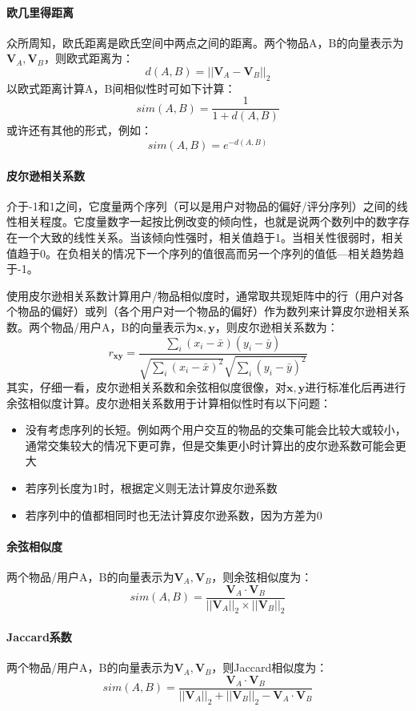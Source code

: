 \paragraph{欧几里得距离}
众所周知，欧氏距离是欧氏空间中两点之间的距离。两个物品A，B的向量表示为$\boldsymbol{V}_A, \boldsymbol{V}_B$，则欧式距离为：
$$
d(A, B) = ||\boldsymbol{V}_A - \boldsymbol{V}_B||_2
$$
以欧式距离计算A，B间相似性时可如下计算：
$$
sim(A, B) = \frac{1}{1 + d(A, B)}
$$
或许还有其他的形式，例如：
$$
sim(A, B) = e^{-d(A, B)}
$$

\paragraph{皮尔逊相关系数}
介于-1和1之间，它度量两个序列（可以是用户对物品的偏好/评分序列）之间的线性相关程度。它度量数字一起按比例改变的倾向性，也就是说两个数列中的数字存在一个大致的线性关系。当该倾向性强时，相关值趋于1。当相关性很弱时，相关值趋于0。在负相关的情况下一个序列的值很高而另一个序列的值低---相关趋势趋于-1。

使用皮尔逊相关系数计算用户/物品相似度时，通常取共现矩阵中的行（用户对各个物品的偏好）或列（各个用户对一个物品的偏好）作为数列来计算皮尔逊相关系数。两个物品/用户A，B的向量表示为$\boldsymbol{x}, \boldsymbol{y}$，则皮尔逊相关系数为：
$$
r_{\boldsymbol{xy}} = \frac{\sum_i (x_i - \bar{x})(y_i - \bar{y})}{\sqrt{\sum_i (x_i - \bar{x})^2} \sqrt{\sum_i (y_i - \bar{y})^2}}
$$
其实，仔细一看，皮尔逊相关系数和余弦相似度很像，对$\boldsymbol{x}, \boldsymbol{y}$进行标准化后再进行余弦相似度计算。皮尔逊相关系数用于计算相似性时有以下问题：
\begin{itemize}
	\item 没有考虑序列的长短。例如两个用户交互的物品的交集可能会比较大或较小，通常交集较大的情况下更可靠，但是交集更小时计算出的皮尔逊系数可能会更大
	\item 若序列长度为1时，根据定义则无法计算皮尔逊系数
	\item 若序列中的值都相同时也无法计算皮尔逊系数，因为方差为0
\end{itemize}


\paragraph{余弦相似度}
两个物品/用户A，B的向量表示为$\boldsymbol{V}_A, \boldsymbol{V}_B$，则余弦相似度为：
$$
sim(A, B) = \frac{\boldsymbol{V}_A \cdot \boldsymbol{V}_B}{||\boldsymbol{V}_A||_2 \times ||\boldsymbol{V}_B||_2}
$$

\paragraph{Jaccard系数}
两个物品/用户A，B的向量表示为$\boldsymbol{V}_A, \boldsymbol{V}_B$，则Jaccard相似度为：
$$
sim(A, B) = \frac{\boldsymbol{V}_A \cdot \boldsymbol{V}_B}{||\boldsymbol{V}_A||_2 + ||\boldsymbol{V}_B||_2 - \boldsymbol{V}_A \cdot \boldsymbol{V}_B}
$$







